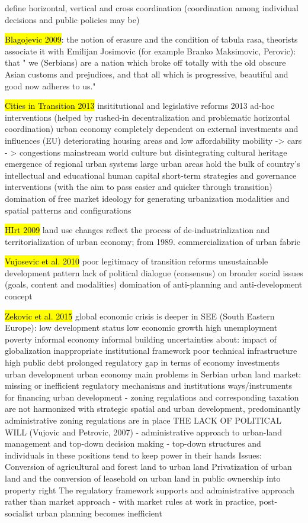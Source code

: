 \documentclass[11pt]{report}
\begin{document}
define horizontal, vertical and cross coordination (coordination among individual decisions and public policies may be)

\hl{Blagojevic 2009}: 
the notion of erasure and the condition of  tabula rasa, theorists associate it with Emilijan Josimovic (for example Branko Maksimovic, Perovic): that " we (Serbians) are a nation which broke off totally with the old obscure Asian customs and prejudices, and that all which is progressive, beautiful and good now adheres to us."

\hl{Cities in Transition 2013}
insititutional and legislative reforms 2013
    ad-hoc interventions  (helped by rushed-in decentralization and problematic horizontal coordination)
    urban economy completely dependent on external investments and influences (EU)
    deteriorating housing areas and low affordability
    mobility -> cars - > congestions
    mainstream world culture but disintegrating cultural heritage
    emergence of regional urban systems
    large urban areas hold the bulk of country's intellectual and educational human capital
    short-term strategies and governance interventions (with the aim to pass easier and quicker through transition)
    domination of free market ideology for generating urbanization modalities and spatial patterns and configurations
    
\hl{HIrt 2009}
land use changes reflect the process of de-industrialization and territorialization of urban economy;
from 1989. commercialization of urban fabric

\hl{Vujosevic et al. 2010}
poor legitimacy of transition reforms
unsustainable development pattern
lack of political dialogue (consensus) on broader social issues (goals, content and modalities)
domination of anti-planning and anti-development concept

\hl{Zekovic et al. 2015}
global economic crisis is deeper in SEE (South Eastern Europe):
    low development status
    low economic growth
    high unemployment
    poverty
    informal economy
    informal building
    uncertainties about:
        impact of globalization
        inappropriate institutional framework
        poor technical infrastructure
        high public debt
    prolonged regulatory gap in terms of
        economy
        investments
        urban development
        urban economy
main problems in Serbian urban land market:
    missing or inefficient regulatory mechanisms and institutions
    ways/instruments for financing urban development
- zoning regulations and corresponding taxation are not harmonized with strategic spatial and urban development, predominantly administrative zoning regulations are in place
THE LACK OF POLITICAL WILL (Vujovic and Petrovic, 2007) - administrative approach to urban-land management and top-down decision making - top-down structures and individuals in these positions tend to keep power in their hands
Issues:
    Conversion of agricultural and forest land to urban land
    Privatization of urban land and the conversion of leasehold on urban land in public ownership into property right
The regulatory framework supports and administrative approach rather than market approach
- with market rules at work in practice, post-socialist urban planning becomes inefficient
\end{document}
